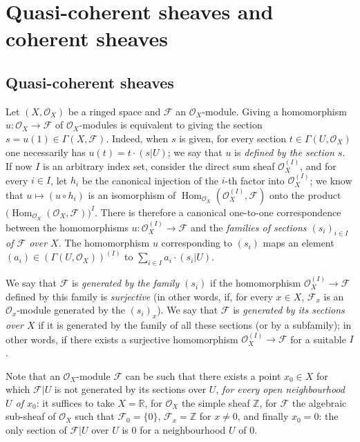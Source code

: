 \section{Quasi-coherent sheaves and coherent sheaves}
\label{section:0.5}

\subsection{Quasi-coherent sheaves}
\label{subsection:0.5.1}

\begin{env}[5.1.1]
\label{0.5.1.1}
Let $(X,\mathcal{O}_X)$ be a ringed space and $\mathcal{F}$ an
$\mathcal{O}_X$-module. Giving a homomorphism
$u:\mathcal{O}_X\to\mathcal{F}$ of $\mathcal{O}_X$-modules is equivalent to giving
the section $s=u(1)\in\Gamma(X,\mathcal{F})$. Indeed, when $s$ is
given, for every section $t\in\Gamma(U,\mathcal{O}_X)$ one necessarily has
$u(t)=t\cdot(s|U)$; we say that $u$ is \emph{defined by the section $s$}. If
now $I$ is an arbitrary index set, consider the direct sum
sheaf $\mathcal{O}_X^{(I)}$, and for every $i\in I$, let $h_i$ be
the canonical injection of the $i$-th factor into $\mathcal{O}_X^{(I)}$; we know
that $u\mapsto(u\circ h_i)$ is an isomorphism of
$\operatorname{Hom}_{\mathcal{O}_X}(\mathcal{O}_X^{(I)},\mathcal{F})$ onto the
product
$\bigl(\operatorname{Hom}_{\mathcal{O}_X}(\mathcal{O}_X,\mathcal{F})\bigr)^I$.
There is therefore a canonical one-to-one correspondence between the homomorphisms
$u:\mathcal{O}_X^{(I)}\to\mathcal{F}$ and the \emph{families of sections
$(s_i)_{i\in I}$ of $\mathcal{F}$ over $X$}. The homomorphism $u$
corresponding to $(s_i)$ maps an element
$(a_i)\in(\Gamma(U,\mathcal{O}_X))^{(I)}$ to
$\sum_{i\in I}a_i\cdot(s_i|U)$.

We say that $\mathcal{F}$ is \emph{generated by the family $(s_i)$} if
the homomorphism $\mathcal{O}_X^{(I)}\to\mathcal{F}$ defined
by this family is \emph{surjective} (in other words, if, for every
$x\in X$, $\mathcal{F}_x$ is an $\mathcal{O}_x$-module generated by the
$(s_i)_x$). We say that $\mathcal{F}$ is \emph{generated by its sections
over $X$} if it is generated by the family of all these sections (or
by a subfamily); in other words, if there exists a surjective homomorphism
$\mathcal{O}_X^{(I)}\to\mathcal{F}$ for a suitable $I$.

Note that an $\mathcal{O}_X$-module $\mathcal{F}$ can be such that there
exists a point $x_0\in X$ for which $\mathcal{F}|U$ is not generated by
its sections over $U$, \emph{for every open neighbourhood $U$ of
$x_0$}: it suffices to take $X=\mathbb{R}$, for $\mathcal{O}_X$ the simple
sheaf $\mathbb{Z}$, for $\mathcal{F}$ the algebraic sub-sheaf of
$\mathcal{O}_X$ such that $\mathcal{F}_0=\{0\}$, $\mathcal{F}_x=\mathbb{Z}$ for
$x\ne0$, and finally $x_0=0$: the only section of $\mathcal{F}|U$ over
$U$ is $0$ for a neighbourhood $U$ of $0$.
\end{env}

